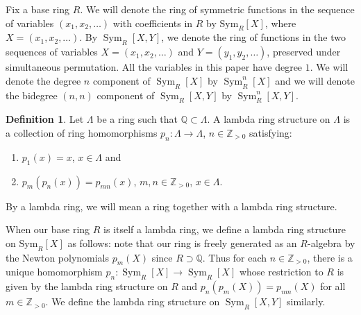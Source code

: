 \documentclass{amsart}
\theoremstyle{plain}
\theoremstyle{definition}
\newtheorem{definition}{Definition}
\theoremstyle{remark}
\DeclareMathOperator{\Sym}{Sym}
\begin{document}
Fix a base ring $R$. We will denote the ring of symmetric functions in the sequence of variables $(x_{1},x_{2},\ldots)$ with coefficients in $R$ by $\text{Sym}_{R}[X]$, where $X=(x_{1},x_{2},\ldots)$.
By $\Sym_{R}[X,Y]$, we denote the ring of functions in the two sequences
of variables $X=(x_{1},x_{2},\ldots)$ and $Y=(y_{1},y_{2},\ldots)$, preserved under simultaneous permutation.
All the variables in this paper have degree $1$. We will denote the degree $n$ component of $\Sym_{R}[X]$ by $\Sym_{R}^{n}[X]$ and we will denote the bidegree $(n,n)$ component of $\Sym_{R}[X,Y]$ by $\Sym_{R}^{n}[X,Y]$.
\begin{definition}
Let $\Lambda$ be a ring such that $\mathbb{Q}\subset \Lambda$. A lambda ring structure on $\Lambda$ is a collection of ring homomorphisms $p_{n}:\Lambda\rightarrow \Lambda$, $n\in\mathbb{Z}_{>0}$ satisfying:
\begin{enumerate}
    \item $p_{1}(x)=x$, $x\in \Lambda$ and
    \item $p_{m}(p_{n}(x))=p_{mn}(x)$, $m,n\in\mathbb{Z}_{>0}$, $x\in \Lambda$.
\end{enumerate}
By a lambda ring, we will mean a ring together with a lambda ring structure.

\end{definition}
When our base ring $R$ is itself a lambda ring, we define a lambda ring structure on $\text{Sym}_{R}[X]$ 
as follows: note that our ring is freely generated as an $R$-algebra by the Newton polynomials $p_m(X)$ since $R\supset\mathbb{Q}$. Thus for each $n\in\mathbb{Z}_{>0}$, there is a unique homomorphism $p_n: \Sym_R[X]\rightarrow \Sym_R[X]$ whose restriction to $R$ is given by the lambda ring structure on $R$ and $p_n(p_m(X))=p_{nm}(X)$ for all $m\in\mathbb{Z}_{>0}$. We define the lambda ring structure on $\Sym_R[X,Y]$ similarly.
\end{document}
